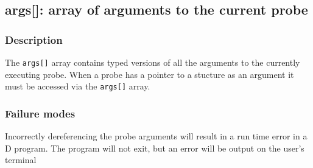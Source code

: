 \clearpage
{}
{}
\label{vars:args}
\subsection*{args[]: array of arguments to the current probe}

\subsubsection*{Description}

The \verb|args[]| array contains typed versions of all the arguments
to the currently executing probe.  When a probe has a pointer to a
stucture as an argument it must be accessed via the \verb|args[]|
array.

\subsubsection*{Failure modes}

Incorrectly dereferencing the probe arguments will result in a run
time error in a D program. The program will not exit, but an error
will be output on the user's terminal
